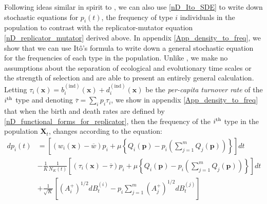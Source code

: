 Following ideas similar in spirit to \citep{mcleod_social_2019}, we can also use \eqref{nD_Ito_SDE} to write down stochastic equations for $p_i(t)$, the frequency of type $i$ individuals in the population to contrast with the replicator-mutator equation \eqref{nD_replicator_mutator} derived above. In appendix \ref{App_density_to_freq}, we show that we can use It\^{o}'s formula to write  down a general stochastic equation for the frequencies of each type in the population. Unlike \citep{mcleod_social_2019}, we make no assumptions about the separation of ecological and evolutionary time scales or the strength of selection and are able to present an entirely general calculation. Letting $\tau_i(\mathbf{x}) = b^{(\textrm{ind})}_{i}(\mathbf{x}) + d^{(\textrm{ind})}_i(\mathbf{x})$ be the \emph{per-capita turnover rate} of the $i\textsuperscript{th}$ type and denoting $\overline{\tau} = \sum_i p_i\tau_i$, we show in appendix \ref{App_density_to_freq} that when the birth and death rates are defined by \eqref{nD_functional_forms_for_replicator}, then the frequency of the $i\textsuperscript{th}$ type in the population $\mathbf{X}_t$, changes according to the equation:
\begin{equation}
\label{nD_eqn_for_frequencies}
\begin{aligned}
dp_i(t) &= \left[(w_i(\mathbf{x}) - \overline{w})p_i + \mu\left\{Q_i(\mathbf{p}) - p_i\left(\sum\limits_{j=1}^{m}Q_j(\mathbf{p})\right)\right\}\right]dt\\
&- \frac{1}{K}\frac{1}{N_{K}(t)}\left[(\tau_i(\mathbf{x}) - \overline{\tau})p_i + \mu\left\{Q_i(\mathbf{p}) - p_i\left(\sum\limits_{j=1}^{m}Q_j(\mathbf{p})\right)\right\}\right]dt\\
&+ \frac{1}{\sqrt{K}}\left[\left(A^{+}_{i}\right)^{1/2}dB^{(i)}_t - p_i\sum\limits_{j=1}^{m}\left(A^{+}_{j}\right)^{1/2}dB^{(j)}_t\right]
\end{aligned}
\end{equation}
